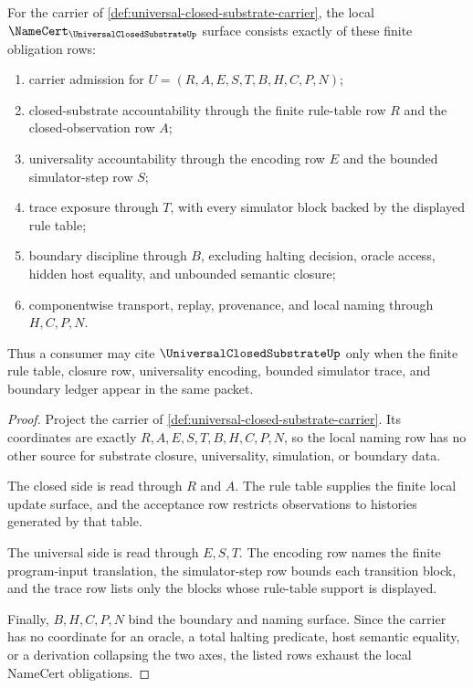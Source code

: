 \begin{theorem}
\label{thm:universal-closed-substrate-namecert-obligations}
For the carrier of \autoref{def:universal-closed-substrate-carrier}, the local $\NameCert_{\UniversalClosedSubstrateUp}$ surface consists exactly of these finite obligation rows:
\begin{enumerate}
\item carrier admission for $U=(R,A,E,S,T,B,H,C,P,N)$;
\item closed-substrate accountability through the finite rule-table row $R$ and the closed-observation row $A$;
\item universality accountability through the encoding row $E$ and the bounded simulator-step row $S$;
\item trace exposure through $T$, with every simulator block backed by the displayed rule table;
\item boundary discipline through $B$, excluding halting decision, oracle access, hidden host equality, and unbounded semantic closure;
\item componentwise transport, replay, provenance, and local naming through $H,C,P,N$.
\end{enumerate}
Thus a consumer may cite $\UniversalClosedSubstrateUp$ only when the finite rule table, closure row, universality encoding, bounded simulator trace, and boundary ledger appear in the same packet.
\end{theorem}
\begin{proof}
Project the carrier of \autoref{def:universal-closed-substrate-carrier}. Its coordinates are exactly $R,A,E,S,T,B,H,C,P,N$, so the local naming row has no other source for substrate closure, universality, simulation, or boundary data.

The closed side is read through $R$ and $A$. The rule table supplies the finite local update surface, and the acceptance row restricts observations to histories generated by that table.

The universal side is read through $E,S,T$. The encoding row names the finite program-input translation, the simulator-step row bounds each transition block, and the trace row lists only the blocks whose rule-table support is displayed.

Finally, $B,H,C,P,N$ bind the boundary and naming surface. Since the carrier has no coordinate for an oracle, a total halting predicate, host semantic equality, or a derivation collapsing the two axes, the listed rows exhaust the local NameCert obligations.
\end{proof}

